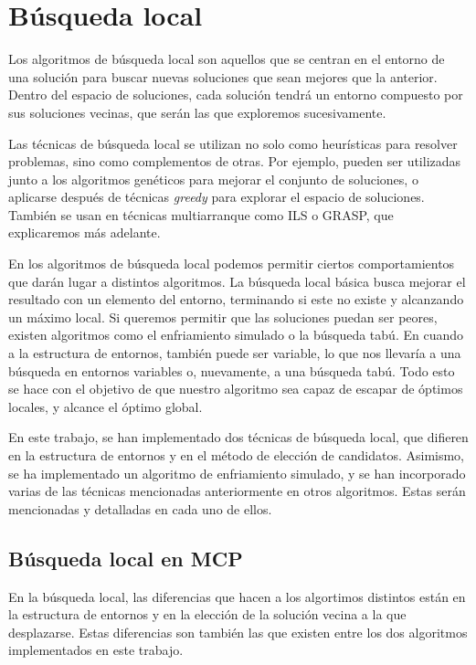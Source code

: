 \section{Búsqueda local}

Los algoritmos de búsqueda local son aquellos que se centran en el entorno de una solución
para buscar nuevas soluciones que sean mejores que la anterior. Dentro del espacio de soluciones,
cada solución tendrá un entorno compuesto por sus soluciones vecinas, que serán las que exploremos
sucesivamente.

Las técnicas de búsqueda local se utilizan no solo como heurísticas para resolver problemas,
sino como complementos de otras. Por ejemplo, pueden ser utilizadas junto a los algoritmos genéticos
para mejorar el conjunto de soluciones, o aplicarse después de técnicas \textit{greedy} para explorar
el espacio de soluciones. También se usan en técnicas multiarranque como ILS o GRASP, que explicaremos
más adelante.

En los algoritmos de búsqueda local podemos permitir ciertos comportamientos que darán lugar a
distintos algoritmos. La búsqueda local básica busca mejorar el resultado con un elemento del
entorno, terminando si este no existe y alcanzando un máximo local. Si queremos permitir que
las soluciones puedan ser peores, existen algoritmos como el enfriamiento simulado o la búsqueda
tabú. En cuando a la estructura de entornos, también puede ser variable, lo que nos llevaría
a una búsqueda en entornos variables o, nuevamente, a una búsqueda tabú. Todo esto se hace con
el objetivo de que nuestro algoritmo sea capaz de escapar de óptimos locales, y alcance el
óptimo global.

En este trabajo, se han implementado dos técnicas de búsqueda local, que difieren en la estructura de
entornos y en el método de elección de candidatos. Asimismo, se ha implementado un algoritmo de
enfriamiento simulado, y se han incorporado varias de las técnicas mencionadas anteriormente en
otros algoritmos. Estas serán mencionadas y detalladas en cada uno de ellos.

\subsection{Búsqueda local en MCP}

En la búsqueda local, las diferencias que hacen a los algortimos distintos están en la estructura
de entornos y en la elección de la solución vecina a la que desplazarse. Estas diferencias son también
las que existen entre los dos algoritmos implementados en este trabajo.

